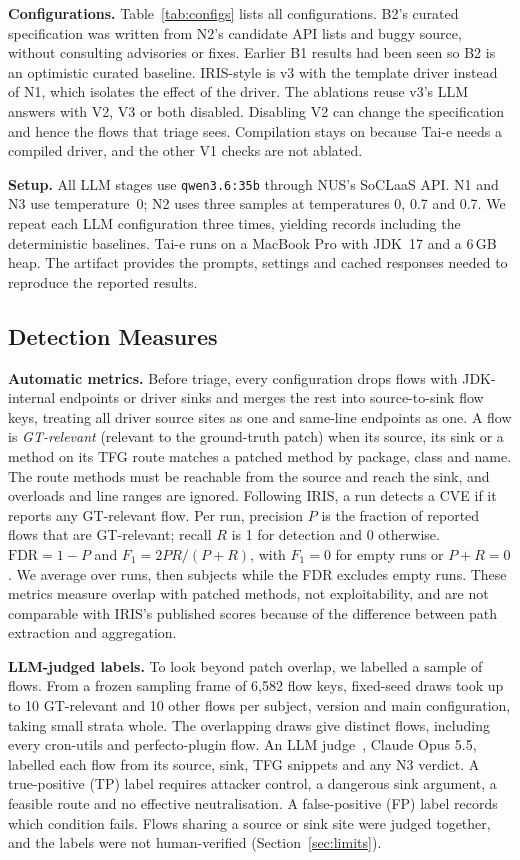 \documentclass[sigconf]{acmart}
\begin{document}
\textbf{Configurations.} Table~\ref{tab:configs} lists all configurations. B2's curated specification was written from N2's candidate API lists and buggy source, without consulting advisories or fixes. Earlier B1 results had been seen so B2 is an optimistic curated baseline. IRIS-style is v3 with the template driver instead of N1, which isolates the effect of the driver. The ablations reuse v3's LLM answers with V2, V3 or both disabled. Disabling V2 can change the specification and hence the flows that triage sees. Compilation stays on because Tai-e needs a compiled driver, and the other V1 checks are not ablated.

\textbf{Setup.} All LLM stages use \texttt{qwen3.6:35b} through NUS's SoCLaaS API. N1 and N3 use temperature~0; N2 uses three samples at temperatures 0, 0.7 and 0.7. We repeat each LLM configuration three times, yielding \NumRuns{} records including the deterministic baselines. Tai-e runs on a MacBook Pro with JDK~17 and a 6\,GB heap. The artifact provides the prompts, settings and cached responses needed to reproduce the reported results.

\subsection{Detection Measures}
\label{sec:measures}
\textbf{Automatic metrics.} Before triage, every configuration drops flows with JDK-internal endpoints or driver sinks and merges the rest into source-to-sink flow keys, treating all driver source sites as one and same-line endpoints as one. A flow is \emph{GT-relevant} (relevant to the ground-truth patch) when its source, its sink or a method on its TFG route matches a patched method by package, class and name. The route methods must be reachable from the source and reach the sink, and overloads and line ranges are ignored. Following IRIS, a run detects a CVE if it reports any GT-relevant flow. Per run, precision $P$ is the fraction of reported flows that are GT-relevant; recall $R$ is 1 for detection and 0 otherwise. $\mathrm{FDR}=1-P$ and $F_1=2PR/(P+R)$, with $F_1=0$ for empty runs or $P+R=0$. We average over runs, then subjects while the FDR excludes empty runs. These metrics measure overlap with patched methods, not exploitability, and are not comparable with IRIS's published scores because of the difference between path extraction and aggregation.

\textbf{LLM-judged labels.} To look beyond patch overlap, we labelled a sample of flows. From a frozen sampling frame of 6,582 flow keys, fixed-seed draws took up to 10 GT-relevant and 10 other flows per subject, version and main configuration, taking small strata whole. The overlapping draws give \NumLabelled{} distinct flows, including every cron-utils and perfecto-plugin flow. An LLM judge~\cite{zheng2023judging}, Claude Opus 5.5, labelled each flow from its source, sink, TFG snippets and any N3 verdict. A true-positive (TP) label requires attacker control, a dangerous sink argument, a feasible route and no effective neutralisation. A false-positive (FP) label records which condition fails. Flows sharing a source or sink site were judged together, and the labels were not human-verified (Section~\ref{sec:limits}).
\end{document}
